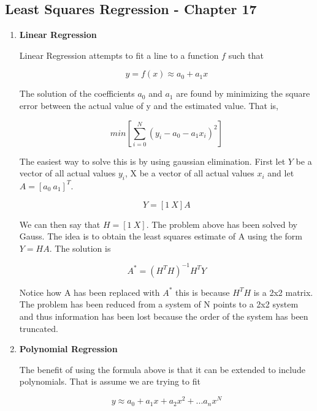 \subsection{Least Squares Regression - Chapter 17}\label{s:lsr}

\begin{enumerate}

\item {\bf Linear Regression}

Linear Regression attempts to fit a line to a function $f$ such that

\begin{equation}
y = f(x) \approx a_0 + a_1 x
\end{equation}

The solution of the coefficients $a_0$ and $a_1$ are found by
minimizing the square error between the actual value of y and the estimated
value. That is,

\begin{equation}
min[\sum\limits_{i=0}^N (y_i - a_0 - a_1 x_i)^2]
\end{equation}

The easiest way to solve this is by using gaussian elimination. First
let $Y$ be a vector of all actual values $y_i$, X be a vector of all
actual values $x_i$ and let $A = [a_0~a_1]^T$.

\begin{equation}
Y = [1~X] A
\end{equation}

We can then say that $H = [1~X]$. The problem above has been solved by
Gauss. The idea is to obtain the least squares estimate of A using the
form $Y=HA$. The solution is

\begin{equation}
A^* = (H^TH)^{-1}H^TY
\end{equation}

Notice how A has been replaced with $A^*$ this is because $H^TH$ is a
2x2 matrix. The problem has been reduced from a system of N points to
a 2x2 system and thus information has been lost because the order of
the system has been truncated. 

\item {\bf Polynomial Regression}

The benefit of using the formula above is that it can be extended to
include polynomials. That is assume we are trying to fit 

\begin{equation}
y \approx a_0 + a_1 x + a_2 x^2 + ... a_n x^N
\end{equation}


\end{enumerate}
